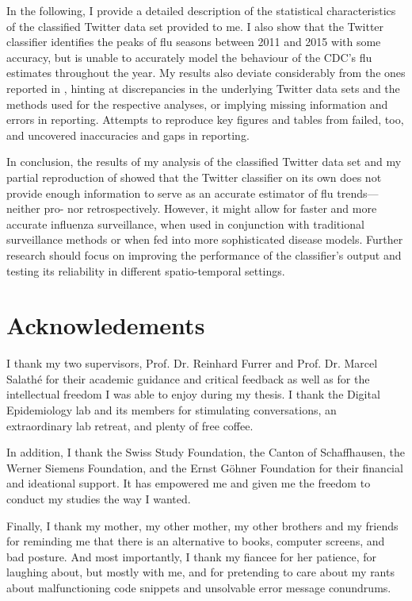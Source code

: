 \documentclass[11pt, a4paper,twoside]{report}\usepackage[]{graphicx}\usepackage[]{color}
\begin{document}
In the following, I provide a detailed description of the statistical characteristics of the classified Twitter data set provided to me. I also show that the Twitter classifier identifies the peaks of flu seasons between 2011 and 2015 with some accuracy, but is unable to accurately model the behaviour of the CDC's flu estimates throughout the year. My results also deviate considerably from the ones reported in \cite{bodnar_data_2015}, hinting at discrepancies in the underlying Twitter data sets and the methods used for the respective analyses, or implying missing information and errors in reporting. Attempts to reproduce key figures and tables from \cite{bodnar_data_2015} failed, too, and uncovered inaccuracies and gaps in reporting.

In conclusion, the results of my analysis of the classified Twitter data set and my partial reproduction of \cite{bodnar_data_2015} showed that the Twitter classifier on its own does not provide enough information to serve as an accurate estimator of flu trends---neither pro- nor retrospectively. However, it might allow for faster and more accurate influenza surveillance, when used in conjunction with traditional surveillance methods or when fed into more sophisticated disease models. Further research should focus on improving the performance of the classifier's output and testing its reliability in different spatio-temporal settings.

\thispagestyle{empty}
\cleardoublepage

\chapter*{Acknowledements}
I thank my two supervisors, Prof. Dr. Reinhard Furrer and Prof. Dr. Marcel Salathé for their academic guidance and critical feedback as well as for the intellectual freedom I was able to enjoy during my thesis. I thank the Digital Epidemiology lab and its members for stimulating conversations, an extraordinary lab retreat, and plenty of free coffee.

In addition, I thank the Swiss Study Foundation, the Canton of Schaffhausen, the Werner Siemens Foundation, and the Ernst Göhner Foundation for their financial and ideational support. It has empowered me and given me the freedom to conduct my studies the way I wanted.

Finally, I thank my mother, my other mother, my other brothers and my friends for reminding me that there is an alternative to books, computer screens, and bad posture. And most importantly, I thank my fiancee for her patience, for laughing about, but mostly with me, and for pretending to care about my rants about malfunctioning code snippets and unsolvable error message conundrums.\newline
\end{document}
